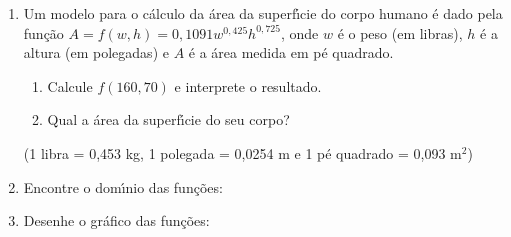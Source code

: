\documentclass[a4paper,5pt]{amsbook}
\newcommand{\ds}{\displaystyle}
\begin{document}
\vspace{1cm}
\begin{enumerate}
    \setlength\itemsep{0.5cm}
    \item Um modelo para o c\'alculo da \'area da superf\'{\i}cie do corpo humano \'e dado
    pela fun\c{c}\~ao $A=f(w,h)=0,1091w^{0,425}h^{0,725}$, onde $w$ \'e o peso (em
    libras), $h$ \'e a altura (em polegadas) e $A$ \'e a \'area medida em p\'e
    quadrado.
        \begin{enumerate}
            \setlength\itemsep{0.2cm}
            \item Calcule $f(160,70)$ e interprete o resultado.
            \item Qual a \'area da superf\'{\i}cie do seu corpo?
        \end{enumerate}
        \vspace{0.2cm}
        (1 libra = 0,453 kg, 1 polegada = 0,0254 m e 1 p\'e quadrado = 0,093 m$^2$)


    \item Encontre o dom\'{\i}nio das fun\c{c}\~oes:


    \item Desenhe o gr\'afico das fun\c{c}\~oes:


\end{enumerate}
\end{document}
